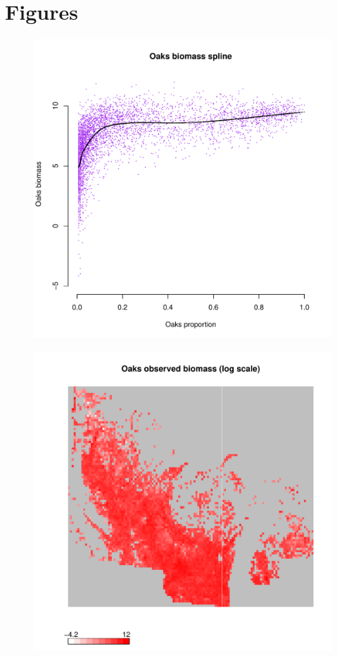 \documentclass[authoryear, review, 11pt]{elsarticle}
\begin{document}
\section{Figures}
\begin{figure}
	\begin{center}
	\includegraphics[width=5in]{../../figures/Oaks-biomass-spline.pdf}
	\end{center}
\end{figure}

\begin{figure}
	\begin{center}
	\includegraphics[width=5in]{../../figures/Oaks-biomass-observed.pdf}
	\end{center}
\end{figure}
\end{document}
